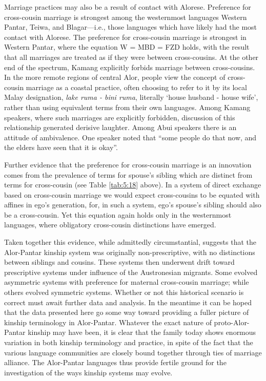 Marriage practices may also be a result of contact with Alorese. Preference for cross-cousin marriage is strongest among the westernmost languages Western Pantar, Teiwa, and Blagar---i.e., those languages which have likely had the most contact with Alorese. The preference for cross-cousin marriage is strongest in Western Pantar, where the equation W = MBD = FZD holds, with the result that all marriages are treated as if they were between cross-cousins. At the other end of the spectrum, Kamang explicitly forbids marriage between cross-cousins. In the more remote regions of central Alor, people view the concept of cross-cousin marriage as a coastal practice, often choosing to refer to it by its local Malay designation, \textit{lake ruma - bini ruma}, literally `house husband - house wife', rather than using equivalent terms from their own languages. Among Kamang speakers, where such marriages are explicitly forbidden, discussion of this relationship generated derisive laughter. Among Abui speakers there is an attitude of ambivalence. One speaker noted that ``some people do that now, and the elders have seen that it is okay''. 

Further evidence that the preference for cross-cousin marriage is an innovation comes from the prevalence of terms for spouse's  sibling which are distinct from terms for cross-cousin (see Table \ref{tab:5:18} above). In a system of direct exchange based on cross-cousin marriage we would expect cross-cousins to be equated with affines in ego's generation, for, in such a system, ego's spouse's sibling should also be a cross-cousin. Yet this equation again holds only in the westernmost languages, where obligatory cross-cousin distinctions have emerged. 

Taken together this evidence, while admittedly circumstantial, suggests that the Alor-Pantar kinship system was originally non-prescriptive, with no distinctions between siblings and cousins. These systems then underwent drift toward prescriptive systems under influence of the Austronesian migrants. Some evolved asymmetric systems with preference for maternal cross-cousin marriage; while others evolved symmetric systems. Whether or not this historical scenario is correct must await further data and analysis. In the meantime it can be hoped that the data presented here go some way toward providing a fuller picture of kinship terminology in Alor-Pantar. Whatever the exact nature of proto-Alor-Pantar kinship may have been, it is clear that the family today shows enormous variation in both kinship terminology and practice, in spite of the fact that the various language communities are closely bound together through ties of marriage alliance. The Alor-Pantar languages thus provide fertile ground for the investigation of the ways kinship systems may evolve.

